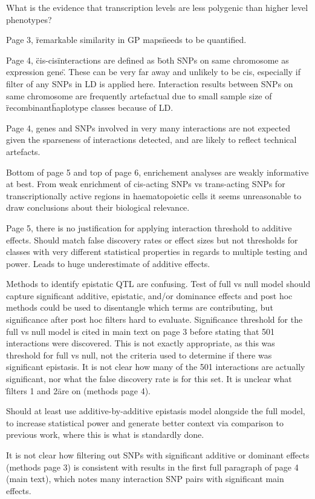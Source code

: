 \documentclass{article}
\begin{document}
What is the evidence that transcription levels are less polygenic than higher level phenotypes?

Page 3, \"remarkable similarity in GP maps\" needs to be quantified.

Page 4, \"cis-cis\" interactions are defined as \"both SNPs on same chromosome as expression gene\". These can be very far away and unlikely to be cis, especially if filter of any SNPs in LD is applied here. Interaction results between SNPs on same chromosome are frequently artefactual due to small sample size of \"recombinant\" haplotype classes because of LD.

Page 4, genes and SNPs involved in very many interactions are not expected given the sparseness of interactions detected, and are likely to reflect technical artefacts.

Bottom of page 5 and top of page 6, enrichement analyses are weakly informative at best. From weak enrichment of cis-acting SNPs vs trans-acting SNPs for transcriptionally active regions in haematopoietic cells it seems unreasonable to draw conclusions about their biological relevance.

Page 5, there is no justification for applying interaction threshold to additive effects. Should match false discovery rates or effect sizes but not thresholds for classes with very different statistical properties in regards to multiple testing and power. Leads to huge underestimate of additive effects.

Methods to identify epistatic QTL are confusing. Test of full vs null model should capture significant additive, epistatic, and/or dominance effects and post hoc methods could be used to disentangle which terms are contributing, but significance after post hoc filters hard to evaluate. Significance threshold for the full vs null model is cited in main text on page 3 before stating that 501 interactions were discovered. This is not exactly appropriate, as this was threshold for full vs null, not the criteria used to determine if there was significant epistasis. It is not clear how many of the 501 interactions are actually significant, nor what the false discovery rate is for this set. It is unclear what \"filters 1 and 2\" are on (methods page 4).

Should at least use additive-by-additive epistasis model alongside the full model, to increase statistical power and generate better context via comparison to previous work, where this is what is standardly done.

It is not clear how filtering out SNPs with significant additive or dominant effects (methods page 3) is consistent with results in the first full paragraph of page 4 (main text), which notes many interaction SNP pairs with significant main effects.
\end{document}
